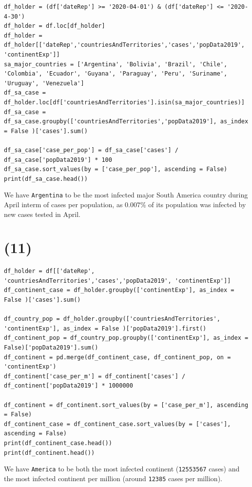 \documentclass[12pt]{article}
\newcommand{\ilc}{\texttt}
\begin{document}
\begin{lstlisting}
df_holder = (df['dateRep'] >= '2020-04-01') & (df['dateRep'] <= '2020-4-30')
df_holder = df.loc[df_holder]
df_holder = df_holder[['dateRep','countriesAndTerritories','cases','popData2019', 'continentExp']]
sa_major_countries = ['Argentina', 'Bolivia', 'Brazil', 'Chile', 'Colombia', 'Ecuador', 'Guyana', 'Paraguay', 'Peru', 'Suriname', 'Uruguay', 'Venezuela']
df_sa_case = df_holder.loc[df['countriesAndTerritories'].isin(sa_major_countries)]
df_sa_case = df_sa_case.groupby(['countriesAndTerritories','popData2019'], as_index = False )['cases'].sum()

df_sa_case['case_per_pop'] = df_sa_case['cases'] / df_sa_case['popData2019'] * 100
df_sa_case.sort_values(by = ['case_per_pop'], ascending = False)
print(df_sa_case.head())

\end{lstlisting}

We have \ilc{Argentina} to be the most infected major South America country during April interm of cases per population, as $0.007\%$ of its population was infected by new cases tested in April.


\section*{(11)}

\begin{lstlisting}
df_holder = df[['dateRep', 'countriesAndTerritories','cases','popData2019', 'continentExp']]
df_continent_case = df_holder.groupby(['continentExp'], as_index = False )['cases'].sum()

df_country_pop = df_holder.groupby(['countriesAndTerritories', 'continentExp'], as_index = False )['popData2019'].first()
df_continent_pop = df_country_pop.groupby(['continentExp'], as_index = False)['popData2019'].sum()
df_continent = pd.merge(df_continent_case, df_continent_pop, on = 'continentExp')
df_continent['case_per_m'] = df_continent['cases'] / df_continent['popData2019'] * 1000000

df_continent = df_continent.sort_values(by = ['case_per_m'], ascending = False)
df_continent_case = df_continent_case.sort_values(by = ['cases'], ascending = False)
print(df_continent_case.head())
print(df_continent.head())
\end{lstlisting}


We have \ilc{America} to be both the most infected continent (\ilc{12553567} cases) and the most infected continent per million (around \ilc{12385} cases per million).
\end{document}
